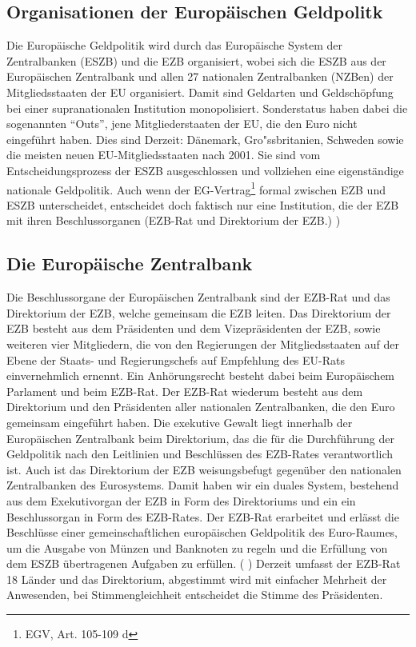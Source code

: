 \documentclass[
    onecolumn,
    a4paper,
    abstracton,
    parskip=half
    ,final
    ]{scrartcl}
\begin{document}
\subsection{Organisationen der Europ{\"a}ischen Geldpolitk}

Die Europ{\"a}ische Geldpolitik wird durch das Europ{\"a}ische System der Zentralbanken (ESZB) und die EZB organisiert, wobei sich die ESZB aus der Europ{\"a}ischen Zentralbank und allen 27 nationalen Zentralbanken (NZBen) der Mitgliedsstaaten der EU organisiert.  Damit sind Geldarten und Geldsch{\"o}pfung bei einer supranationalen Institution monopolisiert. Sonderstatus haben dabei die sogenannten "`Outs"', jene Mitgliederstaaten der EU, die den Euro  nicht eingef{\"u}hrt haben. Dies sind Derzeit: D{\"a}nemark, Gro{"ss}britanien, Schweden sowie die meisten neuen EU-Mitgliedsstaaten nach 2001. Sie sind vom Entscheidungsprozess der ESZB ausgeschlossen und vollziehen eine eigenst{\"a}ndige nationale Geldpolitik.
Auch wenn der EG-Vertrag\footnote[25]{EGV, Art. 105-109 d} formal zwischen EZB und ESZB unterscheidet, entscheidet doch faktisch nur eine Institution, die der EZB mit ihren Beschlussorganen (EZB-Rat und Direktorium der EZB.) \citep[vgl.][S.553]{Basseler2010})

\subsection{Die Europ{\"a}ische Zentralbank}
Die Beschlussorgane der Europ{\"a}ischen Zentralbank sind der EZB-Rat und das Direktorium der EZB, welche gemeinsam die EZB leiten. Das Direktorium der EZB besteht aus dem Pr{\"a}sidenten und dem Vizepr{\"a}sidenten der EZB, sowie weiteren vier Mitgliedern, die von den Regierungen der Mitgliedsstaaten auf der Ebene der Staats- und Regierungschefs auf Empfehlung des EU-Rats einvernehmlich ernennt. Ein Anh{\"o}rungsrecht besteht dabei beim Europ{\"a}ischem Parlament und beim EZB-Rat.
Der EZB-Rat wiederum besteht aus dem Direktorium und den Pr{\"a}sidenten aller nationalen Zentralbanken, die den Euro gemeinsam eingef{\"u}hrt haben.
Die exekutive Gewalt liegt innerhalb der Europ{\"a}ischen Zentralbank beim Direktorium, das die f{\"u}r die Durchf{\"u}hrung der Geldpolitik nach den Leitlinien und Beschl{\"u}ssen des EZB-Rates verantwortlich ist. Auch ist das Direktorium der EZB weisungsbefugt gegen{\"u}ber den nationalen Zentralbanken des Eurosystems.  Damit haben wir ein duales System, bestehend aus dem Exekutivorgan der EZB in Form des Direktoriums und ein ein Beschlussorgan in Form des EZB-Rates.
Der EZB-Rat erarbeitet und erl{\"a}sst die Beschl{\"u}sse einer gemeinschaftlichen europ{\"a}ischen Geldpolitik des Euro-Raumes, um die Ausgabe von M{\"u}nzen und Banknoten zu regeln und die Erf{\"u}llung von dem ESZB {\"u}bertragenen Aufgaben zu erf{\"u}llen.  ( \citep[vgl.][S.553]{Basseler2010} ) Derzeit umfasst der EZB-Rat 18 L{\"a}nder und das Direktorium, abgestimmt wird mit einfacher Mehrheit der Anwesenden, bei Stimmengleichheit entscheidet die Stimme des Pr{\"a}sidenten.
\end{document}
